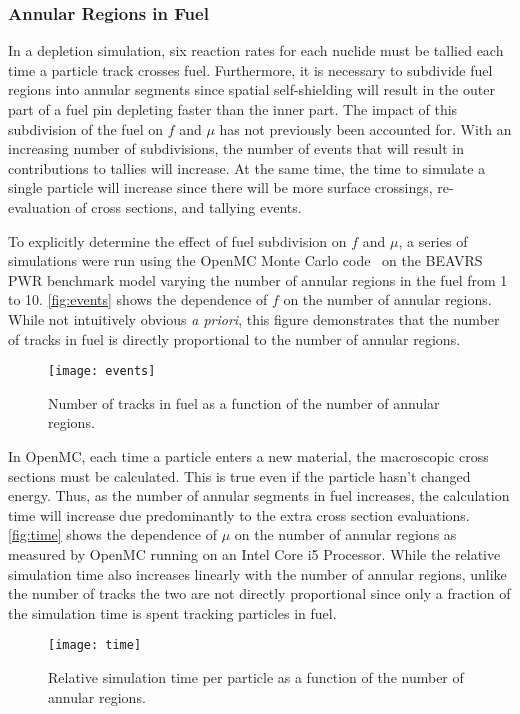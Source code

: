 \documentclass{snamc2013}
\begin{document}
\subsubsection{Annular Regions in Fuel}

In a depletion simulation, six reaction rates for each nuclide must be tallied
each time a particle track crosses fuel. Furthermore, it is necessary to
subdivide fuel regions into annular segments since spatial self-shielding will
result in the outer part of a fuel pin depleting faster than the inner part. The
impact of this subdivision of the fuel on $f$ and $\mu$ has not previously been
accounted for. With an increasing number of subdivisions, the number of events
that will result in contributions to tallies will increase. At the same time,
the time to simulate a single particle will increase since there will be more
surface crossings, re-evaluation of cross sections, and tallying events.

To explicitly determine the effect of fuel subdivision on $f$ and $\mu$, a
series of simulations were run using the OpenMC Monte Carlo
code~\cite{ane-romano-2013} on the BEAVRS PWR benchmark model varying the number
of annular regions in the fuel from 1 to 10.  \autoref{fig:events} shows the
dependence of $f$ on the number of annular regions. While not intuitively
obvious \emph{a priori}, this figure demonstrates that the number of tracks in
fuel is directly proportional to the number of annular regions.
\begin{figure}[htb]
  \centering
  \texttt{[image: events]}
  \caption{Number of tracks in fuel as a function of the number of annular
    regions.}
  \label{fig:events}
\end{figure}

In OpenMC, each time a particle enters a new material, the macroscopic cross
sections must be calculated. This is true even if the particle hasn't changed
energy. Thus, as the number of annular segments in fuel increases, the
calculation time will increase due predominantly to the extra cross section
evaluations. \autoref{fig:time} shows the dependence of $\mu$ on the number of
annular regions as measured by OpenMC running on an Intel Core i5
Processor. While the relative simulation time also increases linearly with the
number of annular regions, unlike the number of tracks the two are not directly
proportional since only a fraction of the simulation time is spent tracking
particles in fuel.
\begin{figure}[b]
  \centering
  \texttt{[image: time]}
  \caption{Relative simulation time per particle as a function of the number of
    annular regions.}
  \label{fig:time}
\end{figure}
\end{document}
